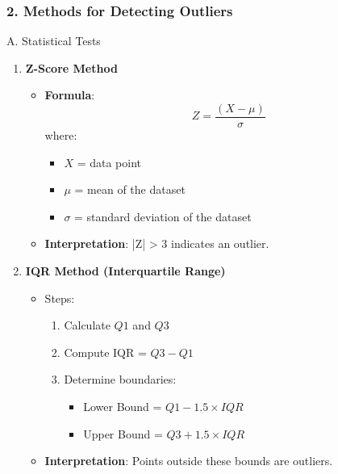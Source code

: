 \documentclass[aspectratio=169]{beamer}
\begin{document}
\begin{frame}
    \frametitle{2. Methods for Detecting Outliers}
    \begin{block}{A. Statistical Tests}
        \begin{enumerate}
            \item \textbf{Z-Score Method}
            \begin{itemize}
                \item \textbf{Formula}:
                \begin{equation}
                Z = \frac{(X - \mu)}{\sigma}
                \end{equation}
                where:
                \begin{itemize}
                    \item $X$ = data point
                    \item $\mu$ = mean of the dataset
                    \item $\sigma$ = standard deviation of the dataset
                \end{itemize}
                \item \textbf{Interpretation}: |Z| > 3 indicates an outlier.
            \end{itemize}
            
            \item \textbf{IQR Method (Interquartile Range)}
            \begin{itemize}
                \item Steps:
                \begin{enumerate}
                    \item Calculate $Q1$ and $Q3$
                    \item Compute IQR = $Q3 - Q1$
                    \item Determine boundaries:
                    \begin{itemize}
                        \item Lower Bound = $Q1 - 1.5 \times IQR$
                        \item Upper Bound = $Q3 + 1.5 \times IQR$
                    \end{itemize}
                \end{enumerate}
                \item \textbf{Interpretation}: Points outside these bounds are outliers.
            \end{itemize}
        \end{enumerate}
    \end{block}
\end{frame}
\end{document}
